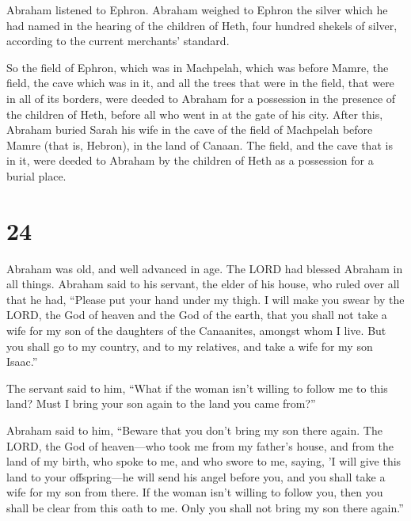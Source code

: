  Abraham listened to Ephron. Abraham weighed to Ephron the
silver which he had named in the hearing of the children of Heth, four
hundred shekels of silver, according to the current merchants' standard.

 So the field of Ephron, which was in Machpelah, which was
before Mamre, the field, the cave which was in it, and all the trees
that were in the field, that were in all of its borders, were deeded
 to Abraham for a possession in the presence of the
children of Heth, before all who went in at the gate of his city.
 After this, Abraham buried Sarah his wife in the cave of
the field of Machpelah before Mamre (that is, Hebron), in the land of
Canaan.  The field, and the cave that is in it, were deeded
to Abraham by the children of Heth as a possession for a burial place.

\hypertarget{section-23}{%
\section{24}\label{section-23}}

 Abraham was old, and well advanced in age. The LORD had
blessed Abraham in all things.  Abraham said to his servant,
the elder of his house, who ruled over all that he had, ``Please put
your hand under my thigh.  I will make you swear by the
LORD, the God of heaven and the God of the earth, that you shall not
take a wife for my son of the daughters of the Canaanites, amongst whom
I live.  But you shall go to my country, and to my
relatives, and take a wife for my son Isaac.''

 The servant said to him, ``What if the woman isn't willing
to follow me to this land? Must I bring your son again to the land you
came from?''

 Abraham said to him, ``Beware that you don't bring my son
there again.  The LORD, the God of heaven---who took me from
my father's house, and from the land of my birth, who spoke to me, and
who swore to me, saying, 'I will give this land to your offspring---he
will send his angel before you, and you shall take a wife for my son
from there.  If the woman isn't willing to follow you, then
you shall be clear from this oath to me. Only you shall not bring my son
there again.''

